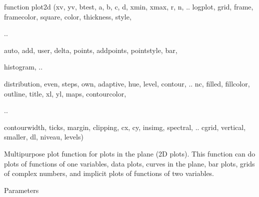 \documentclass[a4paper,10pt]{article}
\begin{document}
\begin{eulernotebook}
\begin{eulercomment}
\begin{eulercomment}
\begin{eulercomment}
\begin{eulercomment}
\begin{eulercomment}
\begin{eulercomment}
\begin{eulercomment}
\begin{eulercomment}
\begin{eulerttcomment}
  function plot2d (xv, yv, btest, a, b, c, d, xmin, xmax, r, n,  ..
  logplot, grid, frame, framecolor, square, color, thickness, style,
\end{eulerttcomment}
\begin{eulercomment}
..\\
\end{eulercomment}
\begin{eulerttcomment}
  auto, add, user, delta, points, addpoints, pointstyle, bar,
\end{eulerttcomment}
\begin{eulercomment}
histogram,  ..\\
\end{eulercomment}
\begin{eulerttcomment}
  distribution, even, steps, own, adaptive, hue, level, contour,  ..
  nc, filled, fillcolor, outline, title, xl, yl, maps, contourcolor,
\end{eulerttcomment}
\begin{eulercomment}
..\\
\end{eulercomment}
\begin{eulerttcomment}
  contourwidth, ticks, margin, clipping, cx, cy, insimg, spectral,  ..
  cgrid, vertical, smaller, dl, niveau, levels)
\end{eulerttcomment}
\begin{eulercomment}

Multipurpose plot function for plots in the plane (2D plots). This
function can do plots of functions of one variables, data plots,
curves in the plane, bar plots, grids of complex numbers, and implicit
plots of functions of two variables.

Parameters


\end{eulercomment}
\end{eulercomment}
\end{eulercomment}
\end{eulercomment}
\end{eulercomment}
\end{eulercomment}
\end{eulercomment}
\end{eulercomment}
\end{eulercomment}
\end{eulernotebook}
\end{document}
